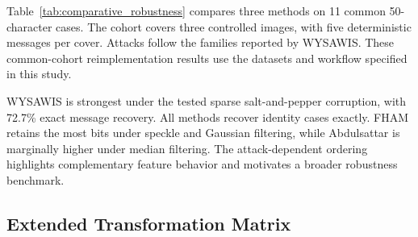 \documentclass[preprint,12pt]{elsarticle}
\theoremstyle{plain}
\begin{document}
\begin{table}[!t]
\centering
\caption{Recovery After Cover Transformations}
\label{tab:robustness}

\end{table}

Table~\ref{tab:comparative_robustness} compares three methods on 11 common
50-character cases. The cohort covers three controlled images, with five
deterministic messages per cover. Attacks follow the families reported by
WYSAWIS. These common-cohort reimplementation results use the datasets and
workflow specified in this study.

\begin{table}[!t]
\centering
\caption{Common-Cohort Bit Accuracy for the Three Mapping Methods}
\label{tab:comparative_robustness}
\resizebox{\linewidth}{!}{}
\end{table}

WYSAWIS is strongest under the tested sparse salt-and-pepper corruption, with
72.7\% exact message recovery. All methods recover identity cases exactly.
FHAM retains the most bits
under speckle and Gaussian filtering, while Abdulsattar is marginally higher
under median filtering. The attack-dependent ordering highlights complementary
feature behavior and motivates a broader robustness benchmark.

\subsection{Extended Transformation Matrix}
\end{document}
